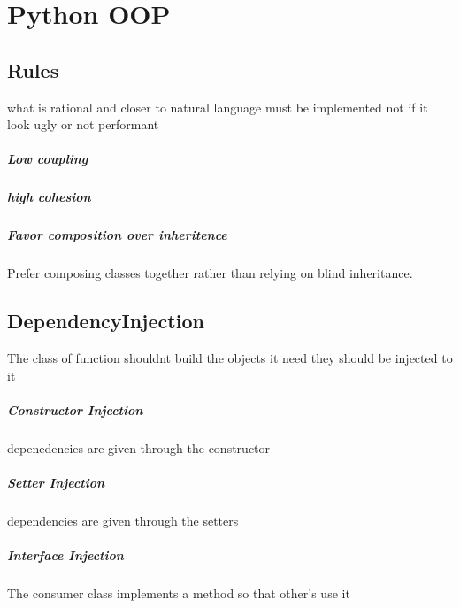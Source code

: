 \chapter{Python OOP}
    
    \section{Rules}
        what is rational and closer to natural language must be implemented not if it look ugly or not performant
        
        \paragraph{Low coupling}
        
        \paragraph{high cohesion}
        
        \paragraph{Favor composition over inheritence}
            Prefer composing classes together rather than relying on blind inheritance.

\section{DependencyInjection}
    The class of function shouldnt build the objects it need they should be injected to it
    
    \paragraph{Constructor Injection}
        depenedencies are given through the constructor
    
    \paragraph{Setter Injection}
        dependencies are given through the setters
    
    \paragraph{Interface Injection}
        The consumer class implements a method so that other's use it

